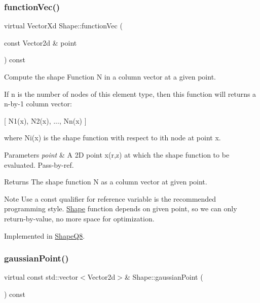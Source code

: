 \subsubsection{\texorpdfstring{function\+Vec()}{functionVec()}}
{\footnotesize\ttfamily virtual Vector\+Xd Shape\+::function\+Vec (\begin{DoxyParamCaption}\item[{const Vector2d \&}]{point }\end{DoxyParamCaption}) const\hspace{0.3cm}{\ttfamily [pure virtual]}}



Compute the shape Function N in a column vector at a given point. 

If n is the number of nodes of this element type, then this function will returns a n-\/by-\/1 column vector\+:

\mbox{[} N1(x), N2(x), ..., Nn(x) \mbox{]}

where Ni(x) is the shape function with respect to ith node at point x.


\begin{DoxyParams}{Parameters}
{\em point} & A 2D point x(r,z) at which the shape function to be evaluated. Pass-\/by-\/ref. \\
\hline
\end{DoxyParams}
\begin{DoxyReturn}{Returns}
The shape function N as a column vector at given point.
\end{DoxyReturn}
\begin{DoxyNote}{Note}
Use a const qualifier for reference variable is the recommended programming style. \mbox{\hyperlink{class_shape}{Shape}} function depends on given point, so we can only return-\/by-\/value, no more space for optimization. 
\end{DoxyNote}


Implemented in \mbox{\hyperlink{class_shape_q8_a7e2de42658deff3c6912cc102b12cc96}{Shape\+Q8}}.

\mbox{\label{class_shape_afa8029d0991fc5d9054a667823224bd0}} 
\subsubsection{\texorpdfstring{gaussian\+Point()}{gaussianPoint()}}
{\footnotesize\ttfamily virtual const std\+::vector$<$Vector2d$>$\& Shape\+::gaussian\+Point (\begin{DoxyParamCaption}{ }\end{DoxyParamCaption}) const\hspace{0.3cm}{\ttfamily [pure virtual]}}



